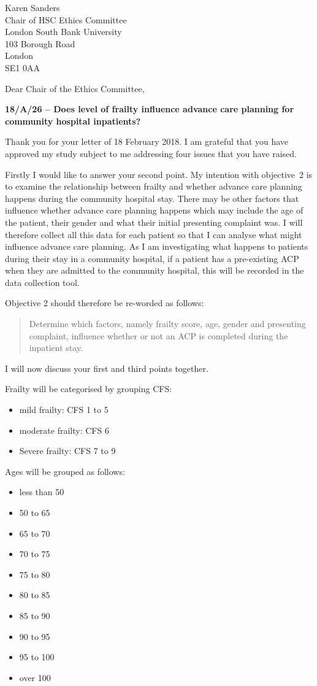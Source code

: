 \documentclass
[
	12pt,
	a4paper,
	oneside
]{letter}
\begin{document}
\begin{letter}{Karen Sanders\\
		Chair of HSC Ethics Committee\\
		London South Bank University\\
		103 Borough Road\\
		London\\
		SE1 0AA}

\opening{Dear Chair of the Ethics Committee,}

\bigskip
\textbf{18/A/26 -- Does level of frailty influence advance care planning 
	for community hospital inpatients? }
\bigskip

Thank you for your letter of 18 February 2018. I am grateful that you have 
approved my study subject to me addressing four issues that you have raised.

Firstly I would like to answer your second point. My intention with objective~2
is to examine the relationship between frailty and whether advance care
planning happens during the community hospital stay. There may be other factors 
that influence whether advance care
planning happens which may include the age of the patient, their gender and what 
their initial presenting complaint was. I will therefore collect all this data for
each patient so that I can analyse what might influence advance care planning. As
I am investigating what happens to patients during their stay in a community
hospital, if a patient has a pre-existing ACP when they are admitted to the 
community hospital, this will be recorded in the data collection tool.

Objective 2 should therefore be re-worded as follows:
	\begin{quote}
		Determine which factors, namely frailty score, age, gender and
		presenting complaint, influence whether or not an ACP is 
		completed during the inpatient stay.
	\end{quote}

I will now discuss your first and third points together.

Frailty will be categorised by grouping CFS:
	\begin{itemize}
		\item mild frailty: CFS 1 to 5
		\item moderate frailty: CFS 6
		\item Severe frailty: CFS 7 to 9
	\end{itemize}

Ages will be grouped as follows:
	\begin{itemize}
		\item less than 50
		\item 50 to 65
		\item 65 to 70
		\item 70 to 75
 		\item 75 to 80
		\item 80 to 85
 		\item 85 to 90
 		\item 90 to 95
 		\item 95 to 100
 		\item over 100
	\end{itemize}


\end{letter}
\end{document}

